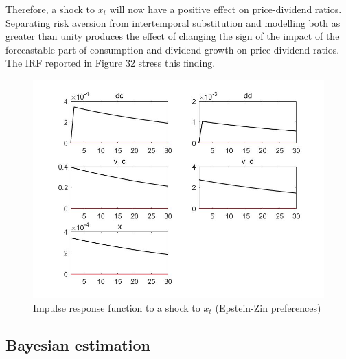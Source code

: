 \documentclass[a4paper,12pt]{scrartcl} %
\begin{document}
Therefore, a shock to $x_t$ will now have a positive effect on price-dividend ratios. Separating risk aversion from intertemporal substitution and modelling both as greater than unity produces the effect of changing the sign of the impact of the forecastable part of consumption and dividend growth on price-dividend ratios. The IRF reported in Figure 32 stress this finding.

\begin{figure}[htbp!]
		\centering
			\includegraphics[width=0.8\linewidth]{fig35.jpg}
            \caption{Impulse response function to a shock to $x_t$ (Epstein-Zin preferences)}\label{35}
\end{figure}

\vspace{4cm}

\subsection{Bayesian estimation}
\end{document}
